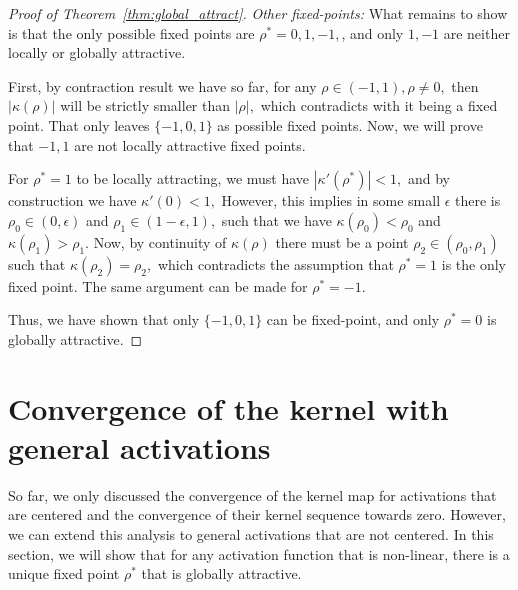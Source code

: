 \documentclass[twoside]{article}
\theoremstyle{definition}
\begin{document}
\begin{proof}[Proof of Theorem~\ref{thm:global_attract}]
\textit{Other fixed-points:}
What remains to show is that the only possible fixed points are $\rho^*=0,1,-1,$, and only $1,-1$ are neither locally or globally attractive.  

First, by contraction result we have so far, for any $\rho \in (-1,1),\rho\neq 0,$ then $|\kappa(\rho)|$ will be strictly smaller than $|\rho|,$ which contradicts with it being a fixed point. That only leaves $\{-1,0,1\}$ as possible fixed points. Now, we will prove that $-1,1$ are not locally attractive fixed points. 

For $\rho^*=1$ to be locally attracting, we must have $|\kappa'(\rho^*)|<1,$ and by construction we have $\kappa'(0)<1,$ However, this implies in some small $\epsilon$ there is $\rho_0\in(0,\epsilon)$ and $\rho_1 \in (1-\epsilon,1),$ such that we have $\kappa(\rho_0) < \rho_0$ and $\kappa(\rho_1) > \rho_1.$ Now, by continuity of $\kappa(\rho)$ there must be a point $\rho_2\in (\rho_0,\rho_1)$ such that $\kappa(\rho_2) = \rho_2,$ which contradicts the assumption that $\rho^*=1$ is the only fixed point. The same argument can be made for $\rho^*=-1.$ 

Thus, we have shown that only $\{-1,0,1\}$ can be fixed-point, and only $\rho^*=0$ is globally attractive.
\end{proof}



\section{Convergence of the kernel with general activations}
So far, we only discussed the convergence of the kernel map for activations that are centered and the convergence of their kernel sequence towards zero. However, we can extend this analysis to general activations that are not centered. In this section, we will show that for any activation function that is non-linear, there is a unique fixed point $\rho^*$ that is globally attractive.
\end{document}
